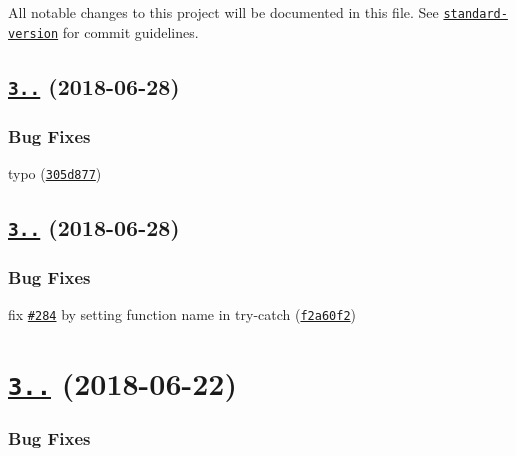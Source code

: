 All notable changes to this project will be documented in this file. See \href{https://github.com/conventional-changelog/standard-version}{\tt standard-\/version} for commit guidelines.

\label{_3.3.2}%
 \subsection*{\href{https://github.com/kelektiv/node-uuid/compare/v3.3.1...v3.3.2}{\tt 3..} (2018-\/06-\/28)}

\subsubsection*{Bug Fixes}


\begin{DoxyItemize}
\item typo (\href{https://github.com/kelektiv/node-uuid/commit/305d877}{\tt 305d877})
\end{DoxyItemize}

\label{_3.3.1}%
 \subsection*{\href{https://github.com/kelektiv/node-uuid/compare/v3.3.0...v3.3.1}{\tt 3..} (2018-\/06-\/28)}

\subsubsection*{Bug Fixes}


\begin{DoxyItemize}
\item fix \href{https://github.com/kelektiv/node-uuid/issues/284}{\tt \#284} by setting function name in try-\/catch (\href{https://github.com/kelektiv/node-uuid/commit/f2a60f2}{\tt f2a60f2})
\end{DoxyItemize}

\label{_3.3.0}%
 \section*{\href{https://github.com/kelektiv/node-uuid/compare/v3.2.1...v3.3.0}{\tt 3..} (2018-\/06-\/22)}

\subsubsection*{Bug Fixes}


